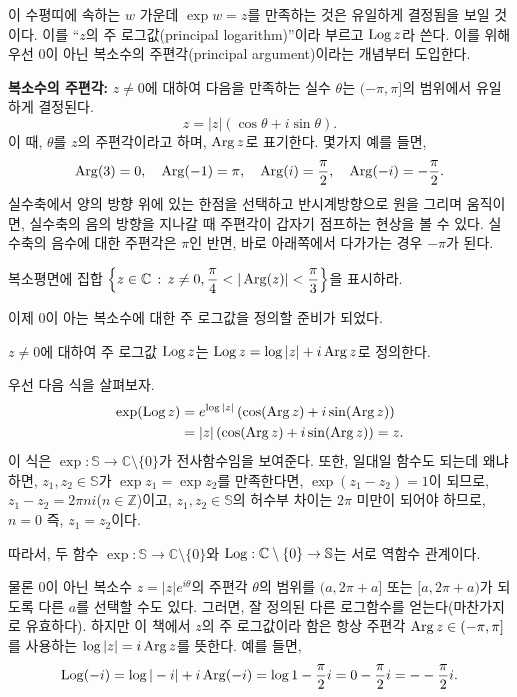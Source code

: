 이 수평띠에 속하는 $w$ 가운데 $\exp w = z$를 만족하는 것은
유일하게 결정됨을 보일 것이다. 
이를 ``$z$의 주 로그값(principal logarithm)''이라 부르고 $\mathop{\mathrm{Log}} z$라 쓴다.
이를 위해 우선 $0$이 아닌 복소수의 주편각(principal argument)이라는 개념부터 도입한다.

{\bf 복소수의 주편각: }
$z\ne0$에 대하여 다음을 만족하는 실수 $\theta$는 $(-\pi, \pi]$의 범위에서 유일하게 결정된다.
$$
z = |z|(\cos \theta + i\sin\theta).
$$
이 때, $\theta$를 $z$의 주편각이라고 하며, $\mathop{\mathrm{Arg}} z$로 표기한다.
몇가지 예를 들면,
$$
\mathop{\mathrm{Arg}}(3) = 0, \quad \mathop{\mathrm{Arg}}(-1)=\pi, \quad
\mathop{\mathrm{Arg}}(i) = \frac\pi2, \quad \mathop{\mathrm{Arg}}(-i) = - \frac\pi2.
$$
실수축에서 양의 방향 위에 있는 한점을 선택하고
반시계방향으로 원을 그리며 움직이면, 실수축의 음의 방향을 지나갈 때
주편각이 갑자기 점프하는 현상을 볼 수 있다.
실수축의 음수에 대한 주편각은 $\pi$인 반면,
바로 아래쪽에서 다가가는 경우 $-\pi$가 된다.

\begin{salt_exercise}\label{ex-1-39}
복소평면에 집합 $\left\{ z \in\mathbb C \,:\, z\ne0, \displaystyle\frac\pi4 < |\mathop{\mathrm{Arg}}(z)| < \displaystyle\frac\pi3 \right\}$을
표시하라.
\end{salt_exercise}

이제 $0$이 아는 복소수에 대한 주 로그값을 정의할 준비가 되었다.

\begin{salt_definition} \label{def-1-3}
$z\ne0$에 대하여 주 로그값 $\mathop{\mathrm{Log}} z$는 
$\mathop{\mathrm{Log}} z = \log |z| + i\mathop{\mathrm{Arg}} z$로 정의한다.
\end{salt_definition}

우선 다음 식을 살펴보자.
\begin{align*}
\exp(\mathop{\mathrm{Log}} z) &= e^{\log |z|} \left( \cos(\mathop{\mathrm{Arg}} z) + i \sin(\mathop{\mathrm{Arg}} z) \right) \\
&= |z| \left( \cos(\mathop{\mathrm{Arg}} z) + i \sin(\mathop{\mathrm{Arg}} z) \right) = z.
\end{align*}
이 식은  $\exp: \mathbb S \to \mathbb C \setminus \{0\}$가 전사함수임을 보여준다.
또한, 일대일 함수도 되는데 왜냐 하면, $z_1, z_2 \in \mathbb S$가 $\exp z_1 = \exp z_2$를 만족한다면,
$\exp(z_1 - z_2) = 1$이 되므로, $z_1 - z_2 = 2\pi ni$($n\in\mathbb Z$)이고,
$z_1, z_2 \in \mathbb S$의 허수부 차이는 $2\pi$ 미만이 되어야 하므로, $n=0$ 즉, 
$z_1 = z_2$이다.

따라서, 두 함수 $\exp : \mathbb S \to \mathbb C \setminus \{0\}$와
$\mathop{\mathrm{Log}} : \mathbb C \setminus \{0\} \to \mathbb S$는 서로 역함수 관계이다.

물론 $0$이 아닌 복소수 $z=|z|e^{i\theta}$의 주편각 $\theta$의 범위를 
$(a, 2\pi +a]$ 또는 $[a, 2\pi+a)$가 되도록 다른 $a$를 선택할 수도 있다.
그러면, 잘 정의된 다른 로그함수를 얻는다(마찬가지로 유효하다).
하지만 이 책에서 $z$의 주 로그값이라 함은 항상 주편각 $\mathop{\mathrm{Arg}} z \in (-\pi, \pi]$를 사용하는
$\log |z| = i\mathop{\mathrm{Arg}} z$를 뜻한다.
예를 들면,
$$
\mathop{\mathrm{Log}} (-i) = \log|-i| + i\mathop{\mathrm{Arg}}(-i) = \log 1 - \displaystyle\frac\pi2 i = 0 - \displaystyle\frac\pi 2 i = -- \displaystyle\frac\pi 2 i.
$$

